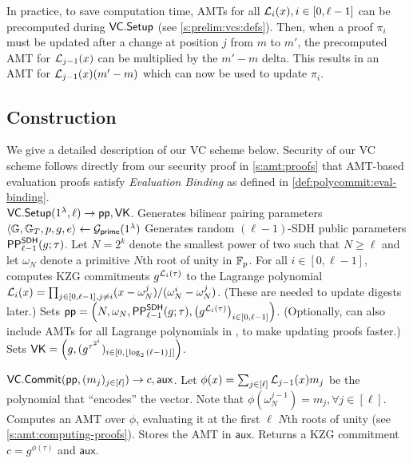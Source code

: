 In practice, to save computation time, AMTs for all $\mathcal{L}_i(x),i\in[0,\ell-1]$ can be precomputed during $\mathsf{VC.Setup}$ (see \cref{s:prelim:vcs:defs}).
Then, when a proof $\pi_i$ must be updated after a change at position $j$ from $m$ to $m'$, the precomputed AMT for $\mathcal{L}_{j-1}(x)$ can be multiplied by the $m'-m$ delta.
This results in an AMT for $\mathcal{L}_{j-1}(x)(m'-m)$ which can now be used to update $\pi_i$.

\subsection{Construction}
We give a detailed description of our VC scheme below.
Security of our VC scheme follows directly from our security proof in \cref{s:amt:proofs} that AMT-based evaluation proofs satisfy \textit{Evaluation Binding} as defined in \cref{def:polycommit:eval-binding}.
\\

\api $\mathsf{VC.Setup}(1^\lambda, \ell)\rightarrow \mathsf{pp},\mathsf{VK}$.
Generates bilinear pairing parameters $\langle \mathbb{G}, \mathbb{G}_T, p, g, e\rangle \leftarrow \mathcal{G}_{\mathsf{prime}}(1^\lambda)$
Generates random $(\ell-1)$-SDH public parameters $\mathsf{PP}^\mathsf{SDH}_{\ell-1}(g; \tau)$.
Let $N=2^k$ denote the smallest power of two such that $N \ge \ell$ and let $\omega_N$ denote a primitive $N$th root of unity in $\mathbb{F}_p$.
For all $i\in[0,\ell-1]$, computes KZG commitments $g^{\mathcal{L}_i(\tau)}$ to the Lagrange polynomial $\mathcal{L}_i(x)=\prod_{j\in [0,\ell-1], j\ne i} (x-\omega_N^j) / (\omega_N^i - \omega_N^j)$.
(These are needed to update digests later.)
Sets $\mathsf{pp} = \left(N, \omega_N, \mathsf{PP}^\mathsf{SDH}_{\ell-1}(g; \tau),\left(g^{\mathcal{L}_i(\tau)}\right)_{i\in[0,\ell-1]}\right)$.
(Optionally, can also include AMTs for all Lagrange polynomials in \pp, to make updating proofs faster.)
Sets $\mathsf{VK} = \left(g, (g^{\tau^{2^i}})_{i\in[0,\lfloor\log_2{(\ell-1)}\rfloor]}\right)$.

\api $\mathsf{VC.Commit}(\mathsf{pp}, (m_j)_{j\in[\ell]}) \rightarrow c, \mathsf{aux}$.
Let $\phi(x)=\sum_{j\in[\ell]} \mathcal{L}_{j-1}(x) m_j$ be the polynomial that ``encodes'' the vector.
Note that $\phi(\omega_N^{j-1})=m_j, \forall j\in[\ell]$.
Computes an AMT over $\phi$, evaluating it at the first $\ell$ $N$th roots of unity (see \cref{s:amt:computing-proofs}).
Stores the AMT in $\mathsf{aux}$.
Returns a KZG commitment $c = g^{\phi(\tau)}$ and $\mathsf{aux}$.

